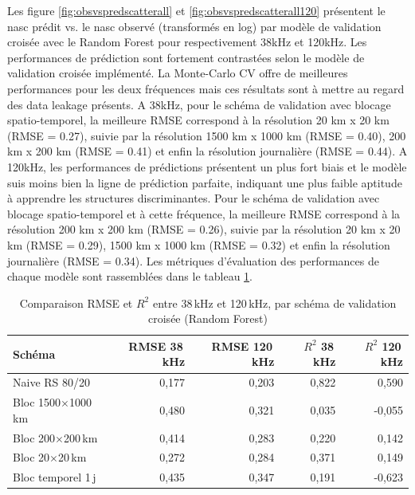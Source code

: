 \documentclass[11pt,a4paper,oneside]{report}
\begin{document}
	Les figure \ref{fig:obsvspredscatterall} et \ref{fig:obsvspredscatterall120} présentent le nasc prédit vs. le nasc observé (transformés en log) par modèle de validation croisée avec le Random Forest pour respectivement 38kHz et 120kHz. Les performances de prédiction sont fortement contrastées selon le modèle de validation croisée implémenté. La Monte-Carlo CV offre de meilleures performances pour les deux fréquences mais ces résultats sont à mettre au regard des data leakage présents. A 38kHz, pour le schéma de validation avec blocage spatio-temporel, la meilleure RMSE correspond à la résolution 20 km x 20 km (RMSE = 0.27), suivie par la résolution 1500 km x 1000 km (RMSE = 0.40), 200 km x 200 km (RMSE = 0.41) et enfin la résolution journalière (RMSE = 0.44). A 120kHz, les performances de prédictions présentent un plus fort biais et le modèle suis moins bien la ligne de prédiction parfaite, indiquant une plus faible aptitude à apprendre les structures discriminantes. Pour le schéma de validation avec blocage spatio-temporel et à cette fréquence, la meilleure RMSE correspond à la résolution 200 km x 200 km (RMSE = 0.26), suivie par la résolution 20 km x 20 km (RMSE = 0.29), 1500 km x 1000 km (RMSE = 0.32) et enfin la résolution journalière (RMSE = 0.34). Les métriques d'évaluation des performances de chaque modèle sont rassemblées dans le tableau \ref{tab:rmse_r2_38_120}.
	
	\begin{table}[H]
		\centering
		\begin{tabular}{lrrrr}
			\toprule
			Schéma & RMSE 38\,kHz & RMSE 120\,kHz & $R^2$ 38\,kHz & $R^2$ 120\,kHz \\
			\midrule
			Naive RS 80/20              & 0,177 & 0,203 & 0,822  & 0,590  \\
			Bloc 1500$\times$1000\,km   & 0,480 & 0,321 & 0,035  & -0,055 \\
			Bloc 200$\times$200\,km     & 0,414 & 0,283 & 0,220  & 0,142  \\
			Bloc 20$\times$20\,km       & 0,272 & 0,284 & 0,371  & 0,149  \\
			Bloc temporel 1\,j          & 0,435 & 0,347 & 0,191  & -0,623 \\
			\bottomrule
		\end{tabular}
		\caption{Comparaison RMSE et $R^2$ entre 38\,kHz et 120\,kHz, par schéma de validation croisée (Random Forest)}
		\label{tab:rmse_r2_38_120}
	\end{table}
	
\end{document}

